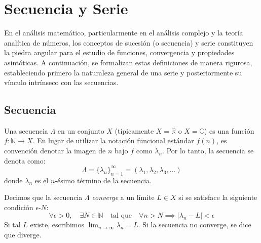 \documentclass[a4paper]{article}
\begin{document}
\tableofcontents

\section{Secuencia y Serie}

En el análisis matemático, particularmente en el análisis complejo y la teoría analítica de números, los conceptos de sucesión (o secuencia) y serie constituyen la piedra angular para el estudio de funciones, convergencia y propiedades asintóticas. A continuación, se formalizan estas definiciones de manera rigurosa, estableciendo primero la naturaleza general de una serie y posteriormente su vínculo intrínseco con las secuencias.

\subsection*{Secuencia}
Una secuencia $\Lambda$ en un conjunto $X$ (típicamente $X = \mathbb{R}$ o $X = \mathbb{C}$) es una función $f: \mathbb{N} \to X$. En lugar de utilizar la notación funcional estándar $f(n)$, es convención denotar la imagen de $n$ bajo $f$ como $\lambda_n$. Por lo tanto, la secuencia se denota como:
$$ \Lambda = \{\lambda_n\}_{n=1}^{\infty} = (\lambda_1, \lambda_2, \lambda_3, \dots) $$
donde $\lambda_n$ es el $n$-ésimo término de la secuencia.

Decimos que la secuencia $\Lambda$ \textit{converge} a un límite $L \in X$ si se satisface la siguiente condición $\epsilon$-$N$:
$$ \forall \epsilon > 0, \quad \exists N \in \mathbb{N} \quad \text{tal que} \quad \forall n > N \implies |\lambda_n - L| < \epsilon $$
Si tal $L$ existe, escribimos $\lim_{n \to \infty} \lambda_n = L$. Si la secuencia no converge, se dice que diverge.
\end{document}
